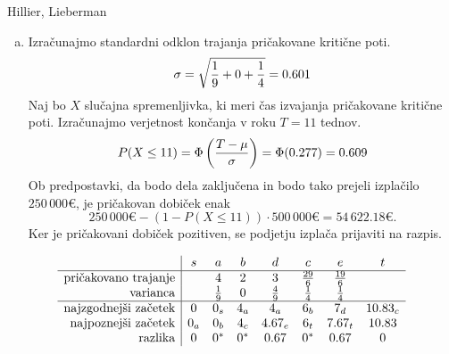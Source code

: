 \begin{naloga}{Hillier, Lieberman}{\cite[Problem~10.4-4]{hl}}
\begin{odgovor}
\begin{enumerate}[(a)]
\item Izračunajmo standardni odklon trajanja pričakovane kritične poti.
$$
\sigma = \sqrt{{1 \over 9} + 0 + {1 \over 4}} = 0.601
$$
Naj bo $X$ slučajna spremenljivka,
ki meri čas izvajanja pričakovane kritične poti.
Izračunajmo verjetnost končanja v roku $T = 11$ tednov.
$$
P(X \le 11) = \Phi\left({T - \mu \over \sigma}\right) = \Phi(0.277) = 0.609
$$
Ob predpostavki,
da bodo dela zaključena in bodo tako prejeli izplačilo $250\,000 €$,
je pričakovan dobiček enak
$$
250\,000 € - (1 - P(X \le 11)) \cdot 500\,000 € = 54\,622.18 € .
$$
Ker je pričakovani dobiček pozitiven, se podjetju izplača prijaviti na razpis.
\end{enumerate}
%
\begin{tabela}
$$
\begin{array}{r|ccccccc}
& s & a & b & d & c & e & t \\ \hline
\text{pričakovano trajanje} &
& 4 & 2 & 3 & {29 \over 6} & {19 \over 6} & \\
\text{varianca} &
& {1 \over 9} & 0 & {4 \over 9} & {1 \over 4} & {1 \over 4} & \\ \hline
\text{najzgodnejši začetek} &
0 & 0_s & 4_a & 4_a & 6_b & 7_d & 10.83_c \\
\text{najpoznejši začetek} &
0_a & 0_b & 4_c & 4.67_e & 6_t & 7.67_t & 10.83 \\
\text{razlika} &
0 & 0^* & 0^* & 0.67 & 0^* & 0.67 & 0
\end{array}
$$
\end{tabela}
%
\begin{slika}
\makebox[\textwidth][c]{
\pgfslika
}
\end{slika}
\end{odgovor}
\end{naloga}
